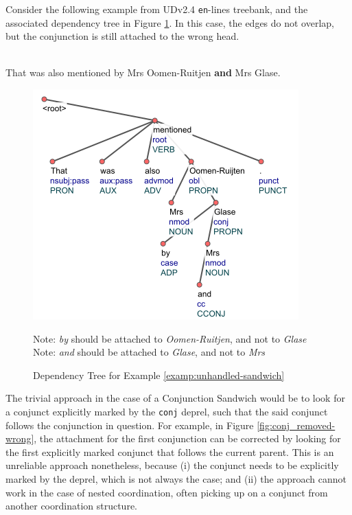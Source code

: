 Consider the following example from UDv2.4 \verb|en|-lines treebank, and the associated dependency tree in Figure \ref{fig:unhandled-sandwich}. In this case, the edges do not overlap, but the conjunction is still attached to the wrong head.

\begin{example}
\label{examp:unhandled-sandwich}
\textbf{}\\
That was also mentioned by Mrs Oomen-Ruitjen \textbf{and} Mrs Glase.
\end{example}

\begin{figure}[H]
    \centering
    \includegraphics[scale=0.90]{img/unhandled-sandwich.png}
    \caption{Dependency Tree for Example \ref{examp:unhandled-sandwich}}
    Note: \textit{by} should be attached to \textit{Oomen-Ruitjen}, and not to \textit{Glase}\\
    Note: \textit{and} should be attached to \textit{Glase}, and not to \textit{Mrs}
    \label{fig:unhandled-sandwich}
\end{figure}

The trivial approach in the case of a Conjunction Sandwich would be to look for a conjunct explicitly marked by the \verb|conj| deprel, such that the said conjunct follows the conjunction in question. For example, in Figure \ref{fig:conj_removed-wrong}, the attachment for the first conjunction can be corrected by looking for the first explicitly marked conjunct that follows the current parent. This is an unreliable approach nonetheless, because (i) the conjunct needs to be explicitly marked by the deprel, which is not always the case; and (ii) the approach cannot work in the case of nested coordination, often picking up on a conjunct from another coordination structure.

